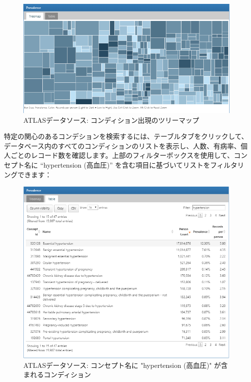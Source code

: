 \documentclass[
  11pt]{book}
\theoremstyle{definition}
\theoremstyle{definition}
\theoremstyle{definition}
\theoremstyle{definition}
\theoremstyle{remark}
\begin{document}
\begin{figure}

{\centering \includegraphics[width=1\linewidth]{images/Characterization/atlasDataSourcesConditionTreemap} 

}

\caption{ATLASデータソース: コンディション出現のツリーマップ}\label{fig:atlasDataSourcesConditionTreemap}
\end{figure}

特定の関心のあるコンデションを検索するには、テーブルタブをクリックして、データベース内のすべてのコンディションのリストを表示し、人数、有病率、個人ごとのレコード数を確認します。上部のフィルターボックスを使用して、コンセプト名に ``hypertension (高血圧)'' を含む項目に基づいてリストをフィルタリングできます：

\begin{figure}

{\centering \includegraphics[width=1\linewidth]{images/Characterization/atlasDataSourcesConditionFiltered} 

}

\caption{ATLASデータソース: コンセプト名に "hypertension (高血圧)" が含まれるコンディション}\label{fig:atlasDataSourcesConditionFiltered}
\end{figure}
\end{document}
